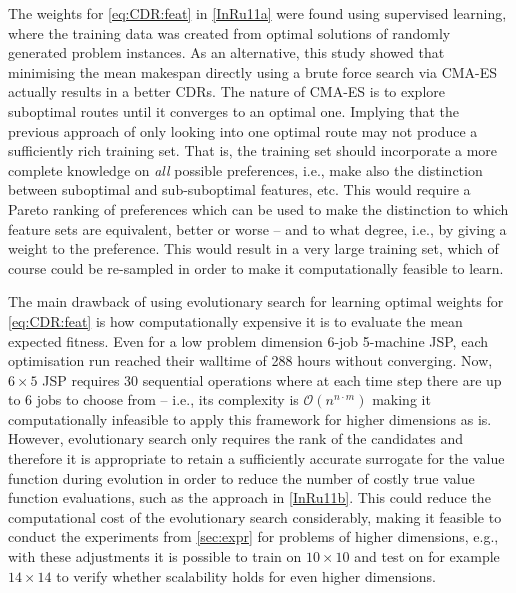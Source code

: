 The weights for \cref{eq:CDR:feat} in \cref{InRu11a} were found using 
supervised learning, where the training data was created from optimal solutions 
of randomly generated problem instances. As an alternative, this study showed  
that minimising the mean makespan directly using a brute force search via 
CMA-ES actually results in a better CDRs. The nature of CMA-ES is to explore 
suboptimal routes until it converges to an optimal one. Implying that the 
previous approach of only looking into one optimal route may not produce a 
sufficiently rich training set. That is, the training set should incorporate a 
more complete knowledge on \emph{all} possible preferences, i.e., make also the 
distinction between suboptimal and sub-suboptimal features, etc.  This would 
require a Pareto ranking of preferences which can be used to make the 
distinction to which feature sets are equivalent, better or worse -- and to 
what degree, i.e., by giving a weight to the preference. This would result in a 
very large training set, which of course could be re-sampled in order to make 
it computationally feasible to learn.

The main drawback of using evolutionary search for learning optimal weights for 
\cref{eq:CDR:feat} is how computationally expensive it is to evaluate the mean 
expected fitness. Even for a low problem dimension 6-job 5-machine JSP, each 
optimisation run reached their walltime of 288 hours without converging. Now, 
$6\times5$ JSP requires 30 sequential operations where at each time step there 
are up to $6$ jobs to choose from -- i.e., its complexity is 
$\mathcal{O}(n^{n\cdot m})$ making it computationally infeasible to apply this 
framework for higher dimensions as is. 
However, evolutionary search only requires the rank of the candidates and 
therefore it is appropriate to retain a sufficiently accurate surrogate for the 
value function during evolution in order to reduce the number of costly true 
value function evaluations, such as the approach in \cref{InRu11b}. This could 
reduce the computational cost of the evolutionary search considerably, making 
it feasible to conduct the experiments from \cref{sec:expr} for problems of 
higher dimensions, e.g., with these adjustments it is possible to train on 
$10\times10$ and test on for example $14\times14$ to verify whether scalability 
holds for even higher dimensions.  





